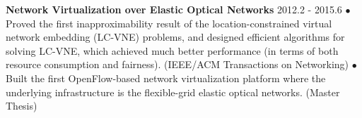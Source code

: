 \documentclass[line,11pt,letter]{F:/Dropbox (Personal)/personal-stuffs/CV/LaTeX/includes/cls/myRes}
\begin{document}
\begin{resume}
{}
{\setlength{\parskip}{0pt}
{\bf Network Virtualization over Elastic Optical Networks} \hfill 2012.2 - 2015.6\break
{\hspace*{1em} $\bullet$ Proved the first inapproximability result of the location-constrained virtual network embedding (LC-VNE) problems, and designed efficient algorithms for solving LC-VNE, which achieved much better performance (in terms of both resource consumption and fairness). (IEEE/ACM Transactions on Networking)\hfill\break}
{\hspace*{1em} $\bullet$ Built the first OpenFlow-based network virtualization platform where the underlying infrastructure is the flexible-grid elastic optical networks. (Master Thesis)\hfill\break}
}
\negspace

\end{resume}
\end{document}
